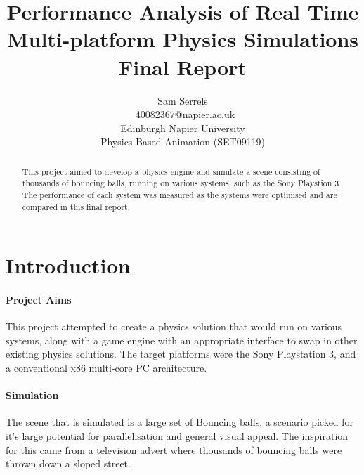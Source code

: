 \documentclass[conference]{acmsiggraph}
\title{Performance Analysis of Real Time Multi-platform Physics Simulations \\
	   Final Report}
\author{Sam Serrels\\\ 40082367@napier.ac.uk \\
Edinburgh Napier University\\
Physics-Based Animation (SET09119)}
\begin{document}

\maketitle

\begin{abstract}
This project aimed to develop a physics engine and simulate a scene consisting of thousands of bouncing balls, running on various systems, such as the Sony Playstion 3.
The performance of each system was measured as the systems were optimised and are compared in this final report.
\end{abstract}

\keywordlist

\section{Introduction}

\paragraph{Project Aims}
This project attempted to create a physics solution that would run on various systems, along with a game engine with an appropriate interface to swap in other existing physics solutions. 
The target platforms were the Sony Playstation 3, and a conventional x86 multi-core PC architecture.

\paragraph{Simulation}
The scene that is simulated is a large set of Bouncing balls, a scenario picked for it's large potential for parallelisation and general visual appeal. The inspiration for this came from a television advert where thousands of bouncing balls were thrown down a sloped street.
\end{document}
